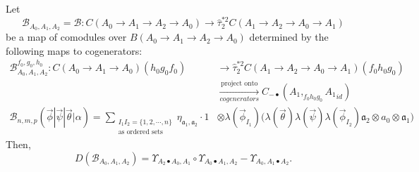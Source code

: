 %
\begin{prop} \label{prop:c4}
Let 
$$
\mathcal{B}_{A_0,A_1,A_2} = \mathcal{B}: 
C(A_0 \to A_1 \to A_2 \to A_0)
\to \hat{\tau}_2^{*2}C(A_1 \to A_2 \to A_0 \to A_1)
$$ 
be a map of comodules over 
$B(A_0 \to A_1 \to A_2 \to A_0)$ 
determined by the following maps to 
cogenerators:
\begin{equation}
\label{eq:def_sigma2}
\begin{split}
\mathcal{B}^{f_0, g_0,h_0}_{A_0,A_1,A_2}: 
  C(A_0 \to A_1 \to A_0)(h_0g_0f_0) 
&\to
\hat{\tau}_2^{*2}C(A_1 \to A_2 \to A_0 \to A_1)
  (f_0h_0g_0)\\
&\xrightarrow[cogenerators]{\textrm{project onto}}
C_{-\bullet}(A_1, _{f_0h_0g_0}{A_1}_{id})\\
\mathcal{B}_{n, m, p} (\vec{\phi} | \vec{\psi} | \vec{\theta} | \alpha) 
= \sum_{\substack{I_1I_2 = \{1,2,\cdots,n\} \\
                          \textrm{as ordered sets}}}
  \eta_{\mathfrak{a}_1,\mathfrak{a}_2}\cdot
  1 &\otimes \lambda(\vec{\phi}_{I_1})\big( \lambda(\vec{\theta}) \lambda(\vec{\psi}) \lambda(\vec{\phi}_{I_2})
  \mathfrak{a}_2 \otimes a_0 \otimes \mathfrak{a}_1 \big)
\end{split}      
\end{equation}
Then, 
\begin{equation} \label{eq:prop4}
D(\mathcal{B}_{A_0,A_1,A_2}) = 
  \Upsilon_{A_2\bullet A_0, A_1} \circ
  \Upsilon_{A_0\bullet A_1, A_2} 
   - \Upsilon_{A_0, A_1\bullet A_2}.
\end{equation}
\end{prop}

